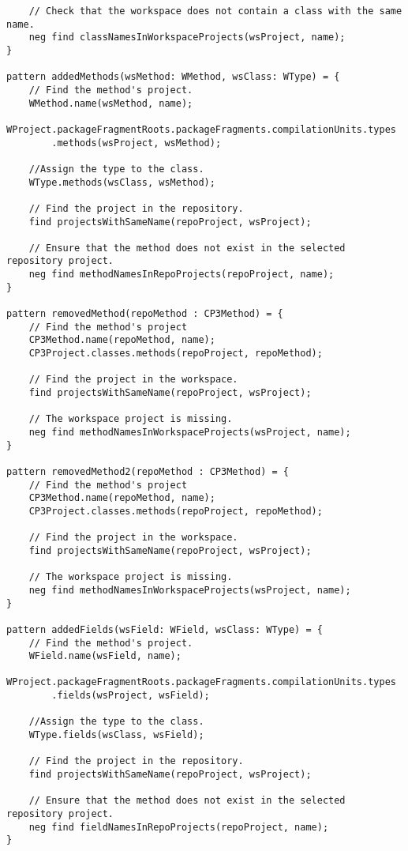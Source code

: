 \begin{lstlisting}
    // Check that the workspace does not contain a class with the same name.
    neg find classNamesInWorkspaceProjects(wsProject, name);
}

pattern addedMethods(wsMethod: WMethod, wsClass: WType) = {
    // Find the method's project.
    WMethod.name(wsMethod, name);
    WProject.packageFragmentRoots.packageFragments.compilationUnits.types
    	.methods(wsProject, wsMethod);

    //Assign the type to the class.
    WType.methods(wsClass, wsMethod);

    // Find the project in the repository.
    find projectsWithSameName(repoProject, wsProject);

    // Ensure that the method does not exist in the selected repository project.
    neg find methodNamesInRepoProjects(repoProject, name);
}

pattern removedMethod(repoMethod : CP3Method) = {
    // Find the method's project
    CP3Method.name(repoMethod, name);
    CP3Project.classes.methods(repoProject, repoMethod);

    // Find the project in the workspace.
    find projectsWithSameName(repoProject, wsProject);

    // The workspace project is missing.
    neg find methodNamesInWorkspaceProjects(wsProject, name);
}

pattern removedMethod2(repoMethod : CP3Method) = {
    // Find the method's project
    CP3Method.name(repoMethod, name);
    CP3Project.classes.methods(repoProject, repoMethod);

    // Find the project in the workspace.
    find projectsWithSameName(repoProject, wsProject);

    // The workspace project is missing.
    neg find methodNamesInWorkspaceProjects(wsProject, name);
}

pattern addedFields(wsField: WField, wsClass: WType) = {
    // Find the method's project.
    WField.name(wsField, name);
    WProject.packageFragmentRoots.packageFragments.compilationUnits.types
    	.fields(wsProject, wsField);

    //Assign the type to the class.
    WType.fields(wsClass, wsField);

    // Find the project in the repository.
    find projectsWithSameName(repoProject, wsProject);

    // Ensure that the method does not exist in the selected repository project.
    neg find fieldNamesInRepoProjects(repoProject, name);
}


\end{lstlisting}
